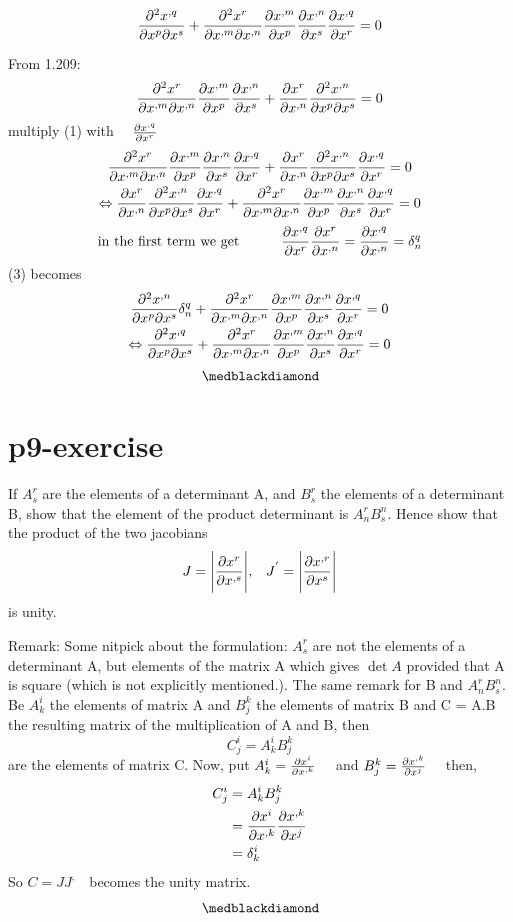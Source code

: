 \begin{tcolorbox}
$$\pdv{x^{,q}}{x^{p}}{x^{s}}+\pdv{x^{r}}{x^{,m}}{x^{,n}}\pdv{x^{,m}}{x^{p}}\pdv{x^{,n}}{x^{s}}\pdv{x^{,q}}{x^{r}} = 0 $$
\end{tcolorbox}
From 1.209:
\begin{gather} 
\pdv{x^r}{x^{,m}}{x^{,n}}\pdv{x^{,m}}{x^{p}}\pdv{x^{,n}}{x^{s}}+\pdv{x^r}{x^{,n}}\pdv{x^{,n}}{x^p}{x^{s}} = 0
\end{gather}
 multiply (1)  with $\quad\pdv{x^{,q}}{x^{r}}$
\begin{gather} 
\pdv{x^r}{x^{,m}}{x^{,n}}\pdv{x^{,m}}{x^{p}}\pdv{x^{,n}}{x^{s}}\pdv{x^{,q}}{x^{r}}+\pdv{x^r}{x^{,n}}\pdv{x^{,n}}{x^p}{x^{s}}\pdv{x^{,q}}{x^{r}} = 0\\
\Leftrightarrow\pdv{x^r}{x^{,n}}\pdv{x^{,n}}{x^p}{x^{s}}\pdv{x^{,q}}{x^{r}}+ \pdv{x^r}{x^{,m}}{x^{,n}}\pdv{x^{,m}}{x^{p}}\pdv{x^{,n}}{x^{s}}\pdv{x^{,q}}{x^{r}}= 0
\end{gather}
\begin{gather} 
\text{\centering in the first term we get\quad\quad}\quad \pdv{x^{,q}}{x^{r}}\pdv{x^r}{x^{,n}} = \pdv{x^{,q}}{x^{,n}} = \delta_n^q
\end{gather}
(3) becomes
\begin{gather} 
\pdv{x^{,n}}{x^p}{x^{s}}\delta_n^q + \pdv{x^r}{x^{,m}}{x^{,n}}\pdv{x^{,m}}{x^{p}}\pdv{x^{,n}}{x^{s}}\pdv{x^{,q}}{x^{r}}=  0\\
\Leftrightarrow\pdv{x^{,q}}{x^p}{x^{s}} + \pdv{x^r}{x^{,m}}{x^{,n}}\pdv{x^{,m}}{x^{p}}\pdv{x^{,n}}{x^{s}}\pdv{x^{,q}}{x^{r}}= 0
\end{gather} 
$$\medblackdiamond$$
\pagebreak[4]



\section{p9-exercise}

\begin{tcolorbox}
If $A_s^r$ are the elements of a determinant A, and $B_s^r$ the elements of a determinant B, show that the element of the product determinant is $A_n^rB^n_s$. Hence show that the product of the two jacobians
$$J =\Bigg|\pdv{x^{r}}{x^{,s}}\Bigg|\text{,}\quad J^{'} = \Bigg|\pdv{x^{,r}}{x^{s}}\Bigg|$$
is unity.
\end{tcolorbox}
Remark: Some nitpick about the formulation: $A_s^r$ are not the elements of a determinant A, but elements of the matrix A which gives $\det{A}$ provided that A is square (which is not explicitly mentioned.). The same remark for B and $A_n^rB^n_s$.\\
Be $A^i_k $ the elements of matrix A and $B^k_j $ the elements of matrix B and C = A.B the resulting matrix of the multiplication of A and B, then
$$C^i_j  = A^i_kB^k_j $$
are the elements of matrix C.
Now, put $A^i_k =\pdv{x^{i}}{x^{,k}} \quad$ and $B^k_j =\pdv{x^{,k}}{x^{j}} \quad$ then,
\begin{align}
C^{i}_{j}  &= A^{i}_{k}B^{k}_{j} \\
&=\pdv{x^{i}}{x^{,k}}\pdv{x^{,k}}{x^{j}}\\
&= \delta^{i}_{k}
\end{align}
So $C = JJ^{,}\quad$becomes the unity matrix. 
$$\medblackdiamond$$
\pagebreak[4]

